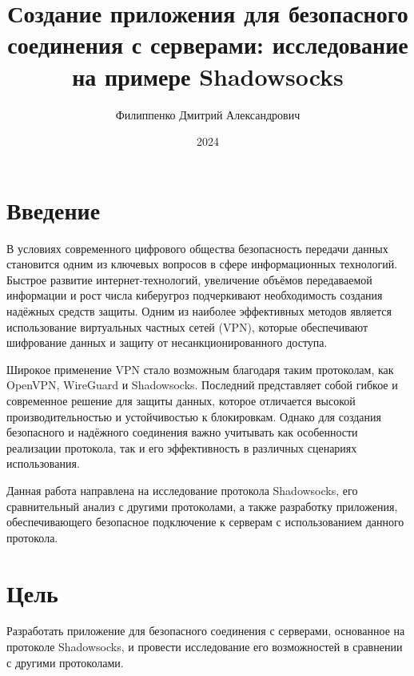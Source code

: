 \documentclass{SCWorks}
\begin{document}

\title{Создание приложения для безопасного соединения с серверами: исследование на примере Shadowsocks}


\author{Филиппенко Дмитрий Александрович}






\date{2024}
\maketitle

\tableofcontents %


\section{Введение}
В условиях современного цифрового общества безопасность передачи данных становится одним из ключевых вопросов в сфере информационных технологий. Быстрое развитие интернет-технологий, увеличение объёмов передаваемой информации и рост числа киберугроз подчеркивают необходимость создания надёжных средств защиты. Одним из наиболее эффективных методов является использование виртуальных частных сетей (VPN), которые обеспечивают шифрование данных и защиту от несанкционированного доступа.

Широкое применение VPN стало возможным благодаря таким протоколам, как OpenVPN, WireGuard и Shadowsocks. Последний представляет собой гибкое и современное решение для защиты данных, которое отличается высокой производительностью и устойчивостью к блокировкам. Однако для создания безопасного и надёжного соединения важно учитывать как особенности реализации протокола, так и его эффективность в различных сценариях использования.

Данная работа направлена на исследование протокола Shadowsocks, его сравнительный анализ с другими протоколами, а также разработку приложения, обеспечивающего безопасное подключение к серверам с использованием данного протокола.

\section*{Цель}
Разработать приложение для безопасного соединения с серверами, основанное на протоколе Shadowsocks, и провести исследование его возможностей в сравнении с другими протоколами.
\end{document}

